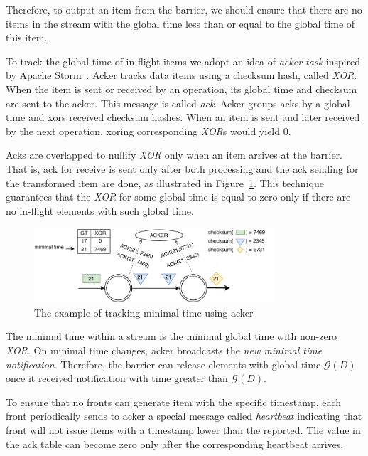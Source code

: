 Therefore, to output an item from the barrier, we should ensure that there are no items in the stream with the global time less than or equal to the global time of this item.

To track the global time of in-flight items we adopt an idea of {\it acker task} inspired by Apache Storm~\cite{apache:storm}. Acker tracks data items using a checksum hash, called {\it XOR}. When the item is sent or received by an operation, its global time and checksum are sent to the acker. This message is called {\it ack}.
 Acker groups acks by a global time and xors received checksum hashes. 
When an item is sent and later received by the next operation, xoring corresponding {\it XOR}s would yield 0.

Acks are overlapped to nullify {\it XOR} only when an item arrives at the barrier. That is, ack for receive is sent only after both processing and the ack sending for the transformed item are done, as illustrated in Figure~\ref{acker}. This technique guarantees that the {\it XOR} for some global time is equal to zero only if there are no in-flight elements with such global time.

\begin{figure}[ht]
  \centering
  \includegraphics[width=0.8\textwidth]{pics/acker}
  \caption{The example of tracking minimal time using acker}
  \label {acker}
\end{figure}

The minimal time within a stream is the minimal global time with non-zero {\it XOR}. On minimal time changes, acker broadcasts the {\it new minimal time notification}. 
Therefore, the barrier can release elements with global time $\mathcal{G} (D)$ 
once it received notification with time greater than $\mathcal{G} (D)$.

To ensure that no fronts can generate item with the specific timestamp, each front periodically sends to acker a special message called {\it heartbeat} indicating that front will not issue items with a timestamp lower than the reported. The value in the ack table can become zero only after the corresponding heartbeat arrives.
